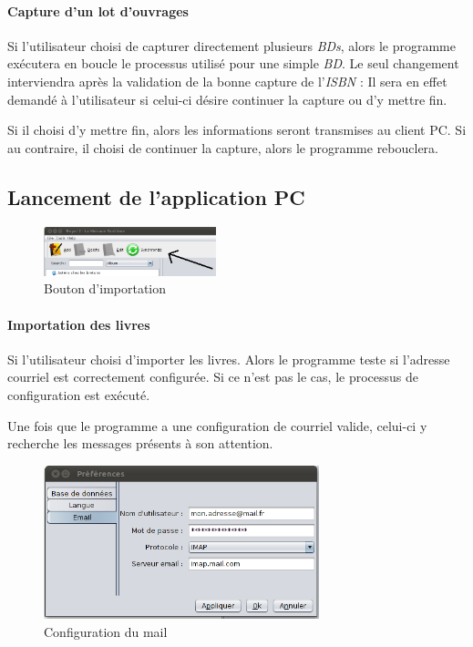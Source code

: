 \paragraph{Capture d'un lot d'ouvrages}
Si l'utilisateur choisi de capturer directement plusieurs \emph{BDs}, alors le programme exécutera en boucle le processus utilisé pour une simple \emph{BD}. 
Le seul changement interviendra après la validation de la bonne capture de l'\emph{ISBN} :
Il sera en effet demandé à l'utilisateur si celui-ci désire continuer la capture ou d'y mettre fin. 

Si il choisi d'y mettre fin, alors les informations seront transmises au client PC. 
Si au contraire, il choisi de continuer la capture, alors le programme rebouclera. 

\subsection{Lancement de l'application PC}


\begin{figure}
\includegraphics[width=5cm]{../img/btn_synchro.png}
\caption{Bouton d'importation}
\end{figure}
\paragraph{Importation des livres}
Si l'utilisateur choisi d'importer les livres. Alors le programme teste si l'adresse courriel est correctement configurée. Si ce n'est pas le cas, le processus de configuration est exécuté. 

Une fois que le programme a une configuration de courriel valide, celui-ci y recherche les messages présents à son attention. 

\begin{figure}
\includegraphics[width=8cm]{../img/preferenceMail.png}
\caption{Configuration du mail}
\end{figure}
